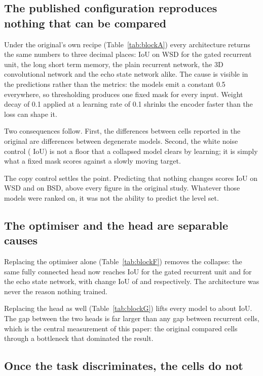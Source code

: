 \subsection{The published configuration reproduces nothing that can be compared}

Under the original's own recipe (Table~\ref{tab:blockA}) every architecture
returns the same numbers to three decimal places: \Awsdgruiou{} IoU on WSD for
the gated recurrent unit, the long short term memory, the plain recurrent
network, the 3D convolutional network and the echo state network alike. The
cause is visible in the predictions rather than the metrics: the models emit a
constant 0.5 everywhere, so thresholding produces one fixed mask for every
input. Weight decay of 0.1 applied at a learning rate of 0.1 shrinks the
encoder faster than the loss can shape it.

Two consequences follow. First, the differences between cells reported in the
original are differences between degenerate models. Second, the white noise
control (\Awsdnoiseiou{} IoU) is not a floor that a collapsed model clears by
learning; it is simply what a fixed mask scores against a slowly moving target.

The copy control settles the point. Predicting that nothing changes scores
\Awsdcopyiou{} IoU on WSD and \Absdcopyiou{} on BSD, above every figure in the
original study. Whatever those models were ranked on, it was not the ability to
predict the level set.

\subsection{The optimiser and the head are separable causes}

Replacing the optimiser alone (Table~\ref{tab:blockF}) removes the collapse:
the same fully connected head now reaches \Fwsdgruiou{} IoU for the gated
recurrent unit and \Fwsdesniou{} for the echo state network, with change IoU of
\Fwsdgruchangeiou{} and \Fwsdesnchangeiou{} respectively. The architecture was
never the reason nothing trained.

Replacing the head as well (Table~\ref{tab:blockG}) lifts every model to about
\Gwsdgruiou{} IoU. The gap between the two heads is far larger than any gap
between recurrent cells, which is the central measurement of this paper: the
original compared cells through a bottleneck that dominated the result.

\subsection{Once the task discriminates, the cells do not}

